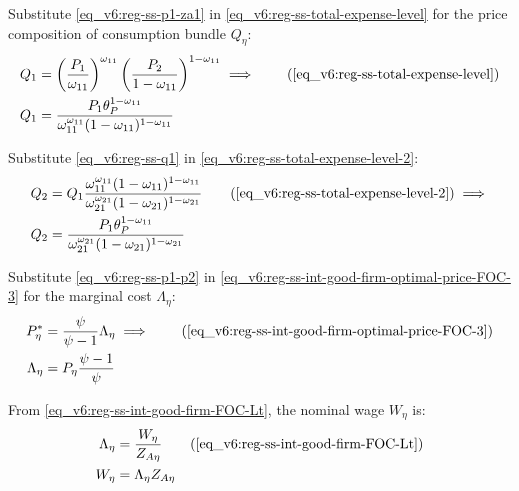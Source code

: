 \documentclass[../thesis.tex]{subfiles}
\begin{document}
Substitute \ref{eq_v6:reg-ss-p1-za1} in \ref{eq_v6:reg-ss-total-expense-level} for the price composition of consumption bundle $Q_{\eta}$:
\begin{align}
	Q_{1} &= \left( \frac{P_{1}}{\omega_{11}} \right)^{\omega_{11}} \left( \frac{P_{2}}{1 -\omega_{11}} \right)^{1 -\omega_{11}} \implies \tag{\ref{eq_v6:reg-ss-total-expense-level}} \\
	Q_{1} &= \frac{P_{1} \theta_{P}^{1 - \omega_{11}}}{\omega_{11}^{\omega_{11}} (1 - \omega_{11})^{1 - \omega_{11}}} \label{eq_v6:reg-ss-q1}
\end{align}

Substitute \ref{eq_v6:reg-ss-q1} in \ref{eq_v6:reg-ss-total-expense-level-2}:
	\begin{align}
	Q_{2} &= Q_{1} \frac{\omega_{11}^{\omega_{11}} (1 - \omega_{11})^{1 - \omega_{11}}}{\omega_{21}^{\omega_{21}} (1 -\omega_{21})^{1 -\omega_{21}}} \tag{\ref{eq_v6:reg-ss-total-expense-level-2}} \implies \\
	Q_{2} &= \frac{P_{1} \theta_{P}^{1 - \omega_{11}}}{\omega_{21}^{\omega_{21}} (1 - \omega_{21})^{1 - \omega_{21}}} \label{eq_v6:reg-ss-q2}
\end{align}

Substitute \ref{eq_v6:reg-ss-p1-p2} in \ref{eq_v6:reg-ss-int-good-firm-optimal-price-FOC-3} for the marginal cost $\Lambda_{\eta}$:
\begin{align}
	P_{\eta}^{\ast} &= \frac{\psi}{\psi-1} \Lambda_{\eta} \implies \tag{\ref{eq_v6:reg-ss-int-good-firm-optimal-price-FOC-3}} \\
	\Lambda_{\eta} &= P_{\eta} \frac{\psi-1}{\psi} \label{eq_v6:reg-ss-marginal-cost}
\end{align}

From \ref{eq_v6:reg-ss-int-good-firm-FOC-Lt}, the nominal wage $W_{\eta}$ is:
\begin{alignat}{2}
	\Lambda_{\eta} &= \frac{W_{\eta}}{Z_{A\eta}} \tag{\ref{eq_v6:reg-ss-int-good-firm-FOC-Lt}} \\
	W_{\eta} &= \Lambda_{\eta} Z_{A\eta} \label{eq_v6:reg-ss-nominal-wage}
\end{alignat}

\begin{comment}
	Substitute \ref{eq_v6:reg-ss-nominal-wage} in \ref{eq_v6:reg-ss-int-good-firm-MC-2} for the technology level of region 2, $Z_{A2}$:
	\begin{align}
		\Lambda_{\eta} &= \frac{1}{Z_{A\eta}} \left( \frac{R_K}{{\alpha_{\eta}}} \right)^{{\alpha_{\eta}}} \left( \frac{W}{1-\alpha_{\eta}} \right)^{1-\alpha_{\eta}} \implies \tag{\ref{eq_v6:reg-ss-int-good-firm-MC-2}} \\
		Z_{A2} &= \frac{1}{\Lambda_{}} \left( \frac{R_K}{{\alpha_{\eta}}} \right)^{{\alpha_{\eta}}} \left( \frac{W}{1-\alpha_{\eta}} \right)^{1-\alpha_{\eta}} \label{eq_v6:reg-ss-za2}
	\end{align}
\end{comment}
\end{document}
